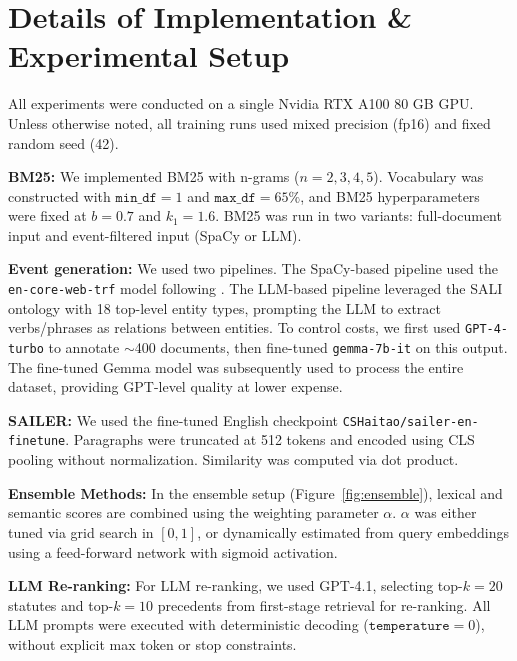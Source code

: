 \section{Details of Implementation \& Experimental Setup} \label{app:implementation}

All experiments were conducted on a single Nvidia RTX A100 80 GB GPU. Unless otherwise noted, all training runs used mixed precision (fp16) and fixed random seed (42).  

\noindent \textbf{BM25:} We implemented BM25 with n-grams ($n=2,3,4,5$). Vocabulary was constructed with $\texttt{min\_df}=1$ and $\texttt{max\_df}=65\%$, and BM25 hyperparameters were fixed at $b=0.7$ and $k_1=1.6$. BM25 was run in two variants: full-document input and event-filtered input (SpaCy or LLM).  

\noindent \textbf{Event generation:} We used two pipelines. The SpaCy-based pipeline used the \texttt{en-core-web-trf} model following \citet{joshi2023ucreat}. The LLM-based pipeline leveraged the SALI ontology with 18 top-level entity types, prompting the LLM to extract verbs/phrases as relations between entities. To control costs, we first used \texttt{GPT-4-turbo} to annotate $\sim$400 documents, then fine-tuned \texttt{gemma-7b-it} on this output. The fine-tuned Gemma model was subsequently used to process the entire dataset, providing GPT-level quality at lower expense.  

\noindent \textbf{SAILER:} We used the fine-tuned English checkpoint \texttt{CSHaitao/sailer-en-finetune}. Paragraphs were truncated at 512 tokens and encoded using CLS pooling without normalization. Similarity was computed via dot product.  

\noindent \textbf{Ensemble Methods:} In the ensemble setup (Figure~\ref{fig:ensemble}), lexical and semantic scores are combined using the weighting parameter $\alpha$. $\alpha$ was either tuned via grid search in $[0,1]$, or dynamically estimated from query embeddings using a feed-forward network with sigmoid activation.  

\noindent \textbf{LLM Re-ranking:} For LLM re-ranking, we used GPT-4.1, selecting top-$k=20$ statutes and top-$k=10$ precedents from first-stage retrieval for re-ranking. All LLM prompts were executed with deterministic decoding ($\texttt{temperature}=0$), without explicit max token or stop constraints.  


